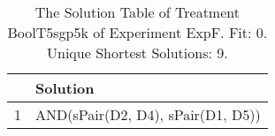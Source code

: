 \begin{table}[ht]
\centering
\begin{tabular}{rp{9cm}}
  \hline
 & Solution \\ 
  \hline
1 & AND(sPair(D2, D4), sPair(D1, D5)) \\ 
   \hline
\end{tabular}
\caption{The Solution Table of Treatment BoolT5sgp5k of Experiment ExpF. Fit: 0. Unique Shortest Solutions: 9.} 
\end{table}
